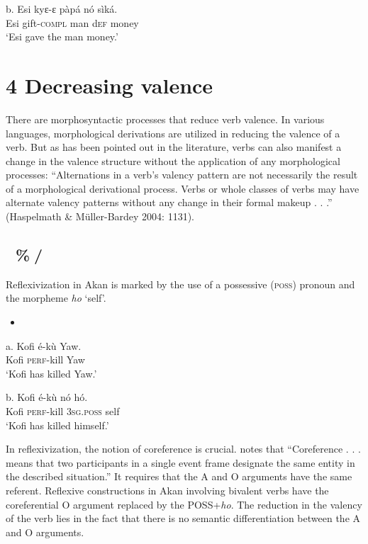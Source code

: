\documentclass[output=paper]{langsci/langscibook}
\begin{document}
\gll  b.  Esi  kyɛ-ɛ    p\`{a}p\'{a}  n\'{o}   s\`{i}k\'{a}.\\
       Esi  gift-\textsc{compl}  man  d\textsc{ef}  money\\
\glt   ‘Esi gave the man money.’
\z

\chapter[4   Decreasing valence ]{4   Decreasing valence }

There are morphosyntactic processes that reduce verb valence. In various languages, morphological derivations are utilized in reducing the valence of a verb. But as has been pointed out in the literature, verbs can also manifest a change in the valence structure without the application of any morphological processes: “Alternations in a verb’s valency pattern are not necessarily the result of a morphological derivational process. Verbs or whole classes of verbs may have alternate valency patterns without any change in their formal makeup . . .” (Haspelmath \& Müller-Bardey 2004: 1131).

\section{ \%/}

Reflexivization in Akan is marked by the use of a possessive (\textsc{poss}) pronoun and the morpheme \emph{ho} ‘self’.

\begin{itemize}
\item \end{itemize}
\gll a.  Kofi  \'{e}-k\`{u}    Yaw.\\
       Kofi  \textsc{perf}{}-kill  Yaw\\
\glt ‘Kofi has killed Yaw.’
\z

\gll  b.  Kofi    \'{e}-k\`{u}    n\'{o}    h\'{o}.\\
       Kofi    \textsc{perf}{}-kill  \textsc{3sg.poss}  self\\
\glt ‘Kofi has killed himself.’
\z

In reflexivization, the notion of coreference is crucial. \citet[44]{Kemmer1993} notes that “Coreference . . .  means that two participants in a single event frame designate the same entity in the described situation.”  It requires that the A and O arguments have the same referent. Reflexive constructions in Akan involving bivalent verbs have the coreferential O argument replaced by the POSS+\emph{ho}.  The reduction in the valency of the verb lies in the fact that there is no semantic differentiation between the A and O arguments. 
\end{document}
